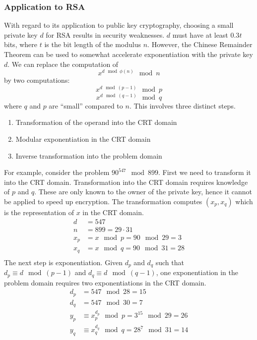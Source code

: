 \documentclass{math}
\begin{document}
\subsubsection*{Application to RSA}
With regard to its application to public key cryptography, choosing a small
private key \( d \) for RSA results in security weaknesses. \( d \) must have
at least \( 0.3t \) bits, where \( t \) is the bit length of the modulus
\( n \). However, the Chinese Remainder Theorem can be used to somewhat
accelerate exponentiation with the private key \( d \). We can replace the
computation of
\[ x^{d\mod\phi(n)}\mod n \]
by two computations:
\[ x^{d\mod(p-1)}\mod p \]
\[ x^{d\mod(q-1)}\mod q \]
where \( q \) and \( p \) are ``small'' compared to \( n \). This involves
three distinct steps.
\begin{enumerate}
  \item Transformation of the operand into the CRT domain
  \item Modular exponentiation in the CRT domain
  \item Inverse transformation into the problem domain
\end{enumerate}
For example, consider the problem \( 90^{547}\mod899 \). First we need to
transform it into the CRT domain. Transformation into the CRT domain requires
knowledge of \( p \) and \( q \). These are only known to the owner of the
private key, hence it cannot be applied to speed up encryption. The
transformation computes \( (x_p,x_q) \) which is the representation of \( x \)
in the CRT domain.
\begin{align*}
  d &= 547 \\
  n &= 899 = 29\cdot31 \\
  x_p &= x\mod p = 90\mod29 = 3 \\
  x_q &= x\mod q = 90\mod31 = 28 \\
\end{align*}
The next step is exponentiation. Given \( d_p \) and \( d_q \) such that
\( d_p\equiv d\mod(p-1) \) and \( d_q\equiv d\mod(q-1) \), one exponentiation
in the problem domain requires two exponentiations in the CRT domain.
\begin{align*}
  d_p &= 547\mod28 = 15 \\
  d_q &= 547\mod30 = 7 \\
  y_p &\equiv x_p^{d_p}\mod p = 3^{15}\mod29 = 26 \\
  y_q &\equiv x_q^{d_q}\mod q = 28^7\mod31 = 14 \\
\end{align*}
\end{document}
